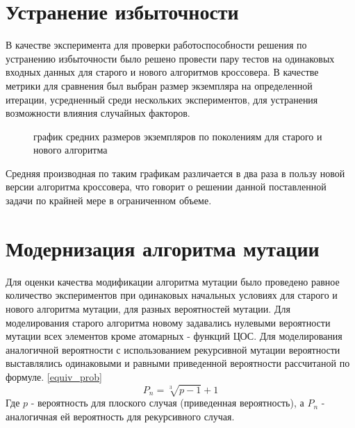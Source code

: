 \documentclass[utf8,usehyperref,12pt]{G7-32}
\begin{document}
\section{Устранение избыточности}
В качестве эксперимента для проверки работоспособности решения по устранению избыточности было решено провести пару тестов на одинаковых входных данных для старого и нового алгоритмов кроссовера. В качестве метрики для сравнения был выбран размер экземпляра на определенной итерации, усредненный среди нескольких экспериментов, для устранения возможности влияния случайных факторов.
\begin{figure}[H]
 \caption{график средних размеров экземпляров по поколениям для старого и нового алгоритма}\label{cross_diff}
\end{figure}
Средняя производная по таким графикам различается в два раза в пользу новой версии алгоритма кроссовера, что говорит о решении данной поставленной задачи по крайней мере в ограниченном объеме.

\section{Модернизация алгоритма мутации}
Для оценки качества модификации алгоритма мутации было проведено равное количество экспериментов при одинаковых начальных условиях для старого и нового алгоритма мутации, для разных вероятностей мутации. Для моделирования старого алгоритма новому задавались нулевыми вероятности мутации всех элементов кроме атомарных - функций ЦОС. Для моделирования аналогичной вероятности с использованием рекурсивной мутации вероятности выставлялись одинаковыми и равными приведенной вероятности рассчитаной по формуле. \ref{equiv_prob}
\begin{equation}
P_{n}=\sqrt[3]{p-1}+1
\label{equiv_prob}
\end{equation}
Где $ p $ - вероятность для плоского случая (приведенная вероятность), а $ P_{n} $ - аналогичная ей вероятность для рекурсивного случая.
\end{document}
